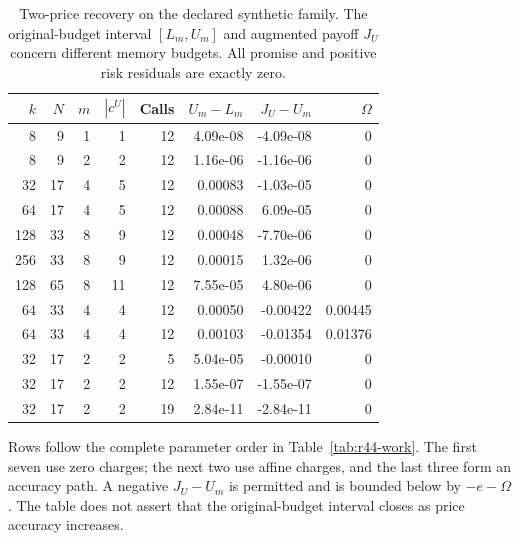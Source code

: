 \begin{table}[p]\centering
\caption{Two-price recovery on the declared synthetic family. The original-budget interval $[L_m,U_m]$ and augmented payoff $J_U$ concern different memory budgets. All promise and positive risk residuals are exactly zero.}\label{tab:r44-scaling}
\small\begin{tabular}{rrrrrrrr}\toprule
$k$ & $N$ & $m$ & $|c^U|$ & Calls & $U_m-L_m$ & $J_U-U_m$ & $\Omega$\\\midrule
8 & 9 & 1 & 1 & 12 & 4.09e-08 & -4.09e-08 & 0\\
8 & 9 & 2 & 2 & 12 & 1.16e-06 & -1.16e-06 & 0\\
32 & 17 & 4 & 5 & 12 & 0.00083 & -1.03e-05 & 0\\
64 & 17 & 4 & 5 & 12 & 0.00088 & 6.09e-05 & 0\\
128 & 33 & 8 & 9 & 12 & 0.00048 & -7.70e-06 & 0\\
256 & 33 & 8 & 9 & 12 & 0.00015 & 1.32e-06 & 0\\
128 & 65 & 8 & 11 & 12 & 7.55e-05 & 4.80e-06 & 0\\
64 & 33 & 4 & 4 & 12 & 0.00050 & -0.00422 & 0.00445\\
64 & 33 & 4 & 4 & 12 & 0.00103 & -0.01354 & 0.01376\\
32 & 17 & 2 & 2 & 5 & 5.04e-05 & -0.00010 & 0\\
32 & 17 & 2 & 2 & 12 & 1.55e-07 & -1.55e-07 & 0\\
32 & 17 & 2 & 2 & 19 & 2.84e-11 & -2.84e-11 & 0\\
\bottomrule\end{tabular}
\par\smallskip\begin{minipage}{.97\textwidth}\footnotesize
Rows follow the complete parameter order in Table~\ref{tab:r44-work}. The first seven use zero charges; the next two use affine charges, and the last three form an accuracy path. A negative $J_U-U_m$ is permitted and is bounded below by $-e-\Omega$. The table does not assert that the original-budget interval closes as price accuracy increases.
\end{minipage}\end{table}
